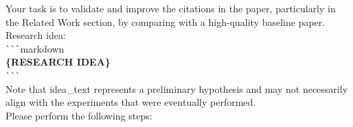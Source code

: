 \begin{tcolorbox}[colback=gray!10, colframe=gray!40!black, breakable=true, title=Prompt for Citation Validation]
Your task is to validate and improve the citations in the paper, particularly in the Related Work section, by comparing with a high-quality baseline paper.\\

Research idea:\\
\verb|```|markdown\\
\textbf{\{RESEARCH IDEA\}}\\
\verb|```|\\

Note that idea\_text represents a preliminary hypothesis and may not necessarily align with the experiments that were eventually performed.\\

Please perform the following steps:\\


\end{tcolorbox}
